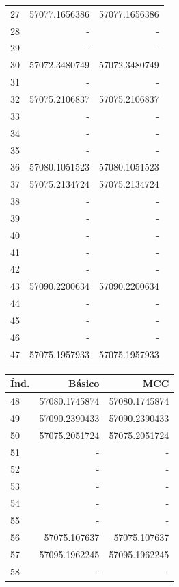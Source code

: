 \begin{appendix}
\begin{table}[h!]
\begin{tabular}{|l|r|r|}
27&57077.1656386 & 57077.1656386 \\
28&-             & -             \\
29&-             & -             \\
30&57072.3480749 & 57072.3480749 \\
31&-             & -             \\
32&57075.2106837 & 57075.2106837 \\
33&-             & -             \\
34&-             & -             \\
35&-             & -             \\
36&57080.1051523 & 57080.1051523 \\
37&57075.2134724 & 57075.2134724 \\
38&-             & -             \\
39&-             & -             \\
40&-             & -             \\
41&-             & -             \\
42&-             & -             \\
43&57090.2200634 & 57090.2200634 \\
44&-             & -             \\
45&-             & -             \\
46&-             & -             \\
47&57075.1957933 & 57075.1957933 \\\hline
\end{tabular}
\quad
\begin{tabular}{|l|r|r|}
\hline
\textbf{\'Ind.} & \textbf{B\'asico} & \textbf{MCC} \\
\hline
48&57080.1745874 & 57080.1745874 \\
49&57090.2390433 & 57090.2390433 \\
50&57075.2051724 & 57075.2051724 \\
51&-             & -             \\
52&-             & -             \\
53&-             & -             \\
54&-             & -             \\
55&-             & -             \\
56&57075.107637  & 57075.107637  \\
57&57095.1962245 & 57095.1962245 \\
58&-             & -             \\

\end{tabular}
\end{table}
\end{appendix}

